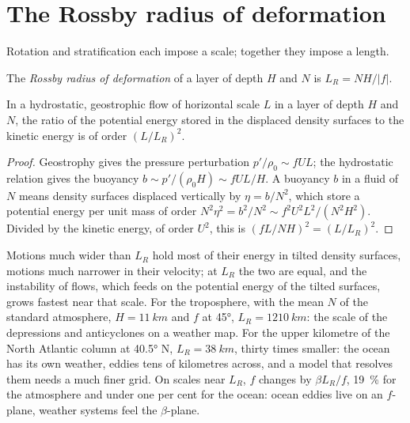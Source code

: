 \section{The Rossby radius of deformation}\label{sec:b3:gfd-foundations:rossby-radius}

Rotation and stratification each impose a scale; together they impose a
length.

\begin{definition}\label{def:b3:gfd-foundations:rossby-radius}
The \emph{Rossby radius of deformation}
of a layer of depth $H$ and  $N$ is $L_R = NH/|f|$.
\end{definition}

\begin{proposition}\label{prop:b3:gfd-foundations:rossby-radius}
In a hydrostatic, geostrophic flow of horizontal scale $L$ in a layer of
depth $H$ and  $N$, the ratio of the potential energy
stored in the displaced density surfaces to the kinetic energy is of order
$(L/L_R)^2$.
\end{proposition}

\begin{proof}
Geostrophy gives the pressure perturbation $p'/\rho_0 \sim fUL$; the
hydrostatic relation gives the buoyancy $b \sim p'/(\rho_0H) \sim fUL/H$. A
buoyancy $b$ in a fluid of  $N$ means density surfaces
displaced vertically by $\eta = b/N^2$, which store a potential energy per
unit mass of order $N^2\eta^2 = b^2/N^2 \sim f^2U^2L^2/(N^2H^2)$. Divided
by the kinetic energy, of order $U^2$, this is $(fL/NH)^2 = (L/L_R)^2$.
\end{proof}

Motions much wider than $L_R$ hold most of their energy in tilted density
surfaces, motions much narrower in their velocity; at $L_R$ the two are
equal, and the instability of  flows, which feeds on the
potential energy of the tilted surfaces, grows fastest near that scale. For
the troposphere, with the mean $N$ of the standard atmosphere, $H =
\qty{11}{km}$ and $f$ at \ang{45}, $L_R = \qty{1210}{km}$: the scale of the
depressions and anticyclones on a weather map. For the upper kilometre of
the North Atlantic column at \ang{40.5} N, $L_R = \qty{38}{km}$, thirty
times smaller: the ocean has its own weather, eddies tens of kilometres
across, and a model that resolves them needs a much finer grid. On scales
near $L_R$, $f$ changes by $\beta L_R/f$, \qty{19}{\percent} for the
atmosphere and under one per cent for the ocean: ocean eddies live on an
$f$-plane, weather systems feel the $\beta$-plane.

